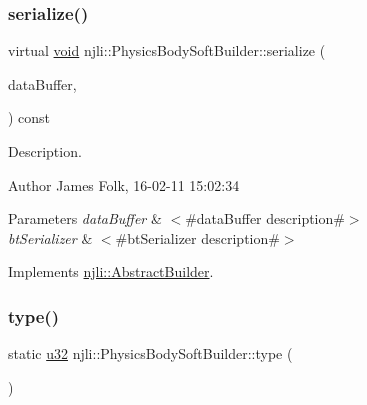 \subsubsection{\texorpdfstring{serialize()}{serialize()}}
{\footnotesize\ttfamily virtual \mbox{\hyperlink{_thread_8h_af1e856da2e658414cb2456cb6f7ebc66}{void}} njli\+::\+Physics\+Body\+Soft\+Builder\+::serialize (\begin{DoxyParamCaption}\item[{\mbox{\hyperlink{_thread_8h_af1e856da2e658414cb2456cb6f7ebc66}{void}} $\ast$}]{data\+Buffer,  }\item[{bt\+Serializer $\ast$}]{ }\end{DoxyParamCaption}) const\hspace{0.3cm}{\ttfamily [virtual]}}



Description. 

\begin{DoxyAuthor}{Author}
James Folk, 16-\/02-\/11 15\+:02\+:34
\end{DoxyAuthor}

\begin{DoxyParams}{Parameters}
{\em data\+Buffer} & $<$\#data\+Buffer description\#$>$ \\
\hline
{\em bt\+Serializer} & $<$\#bt\+Serializer description\#$>$ \\
\hline
\end{DoxyParams}


Implements \mbox{\hyperlink{classnjli_1_1_abstract_builder_ab66b774e02ccb9da554c9aab7fa6d981}{njli\+::\+Abstract\+Builder}}.

\mbox{\label{classnjli_1_1_physics_body_soft_builder_aa048da2b8737da157b54153587db7f5d}} 
\subsubsection{\texorpdfstring{type()}{type()}}
{\footnotesize\ttfamily static \mbox{\hyperlink{_util_8h_a10e94b422ef0c20dcdec20d31a1f5049}{u32}} njli\+::\+Physics\+Body\+Soft\+Builder\+::type (\begin{DoxyParamCaption}{ }\end{DoxyParamCaption})\hspace{0.3cm}{\ttfamily [static]}}


